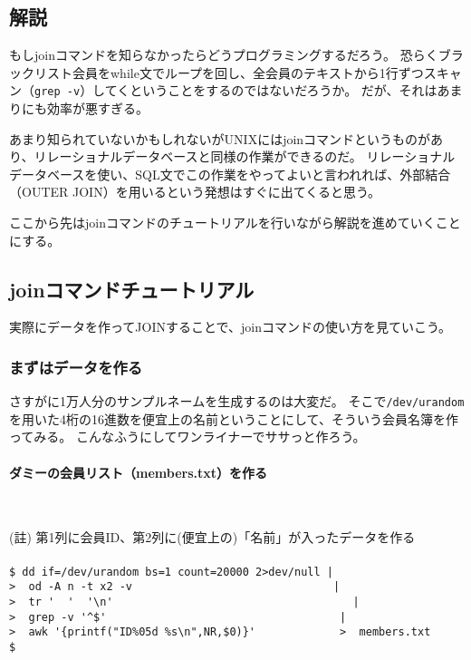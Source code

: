 \subsection*{解説}

もしjoinコマンドを知らなかったらどうプログラミングするだろう。
恐らくブラックリスト会員をwhile文でループを回し、全会員のテキストから1行ずつスキャン（\verb|grep -v|）してくということをするのではないだろうか。
だが、それはあまりにも効率が悪すぎる。

あまり知られていないかもしれないがUNIXにはjoinコマンドというものがあり、リレーショナルデータベースと同様の作業ができるのだ。
リレーショナルデータベースを使い、SQL文でこの作業をやってよいと言われれば、外部結合（OUTER JOIN）を用いるという発想はすぐに出てくると思う。

ここから先はjoinコマンドのチュートリアルを行いながら解説を進めていくことにする。

\subsection*{joinコマンドチュートリアル}

実際にデータを作ってJOINすることで、joinコマンドの使い方を見ていこう。

\subsubsection*{まずはデータを作る}

さすがに1万人分のサンプルネームを生成するのは大変だ。
そこで\verb|/dev/urandom|を用いた4桁の16進数を便宜上の名前ということにして、そういう会員名簿を作ってみる。
こんなふうにしてワンライナーでササっと作ろう。

\paragraph{ダミーの会員リスト（members.txt）を作る}　\\
\begin{screen}
	(註) 第1列に会員ID、第2列に(便宜上の)「名前」が入ったデータを作る \\
	\\
	\verb!$ dd if=/dev/urandom bs=1 count=20000 2>dev/null |! \return \\
	\verb!>  od -A n -t x2 -v                               |! \return \\
	\verb!>  tr '  '  '\n'                                     |! \return \\
	\verb!>  grep -v '^$'                                    |! \return \\
	\verb!>  awk '{printf("ID%05d %s\n",NR,$0)}'             >  members.txt! \\
	\verb|$ |
\end{screen}

